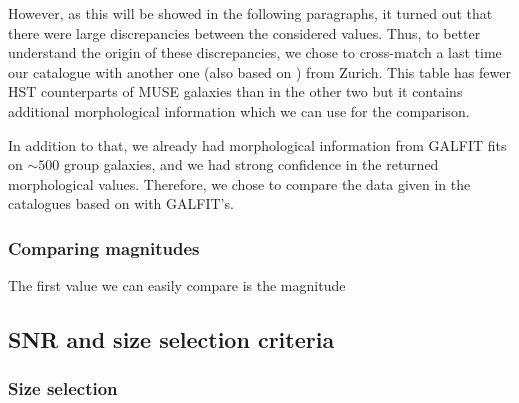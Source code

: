 However, as this will be showed in the following paragraphs, it turned out that there were large discrepancies between the considered values. Thus, to better understand the origin of these discrepancies, we chose to cross-match a last time our catalogue with another one (also based on ) from Zurich. This table has fewer HST counterparts of MUSE galaxies than in the other two but it contains additional morphological information which we can use for the comparison. 

In addition to that, we already had morphological information from GALFIT fits on $\sim 500$ group galaxies, and we had strong confidence in the returned morphological values. Therefore, we chose to compare the data given in the catalogues based on  with GALFIT's.

\subsubsection{Comparing magnitudes}

The first value we can easily compare is the magnitude 


\subsection{SNR and size selection criteria}

\subsubsection{Size selection}

